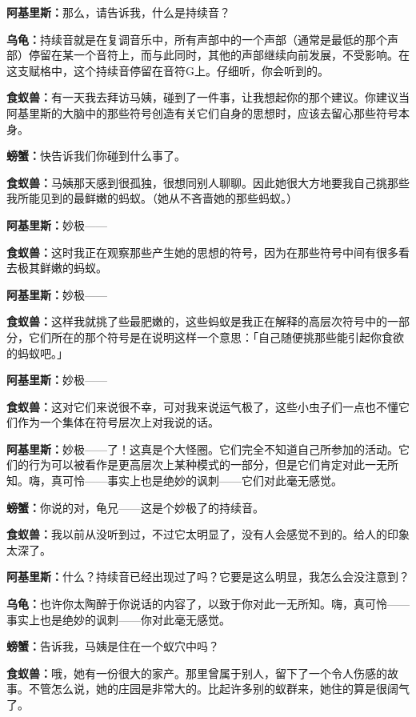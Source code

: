 \documentclass[
  12pt,
  twoside,
  openright,
  oldfontcommands,
]{memoir}
\newcommand{\kaitismall}[1]{{\kaitifamily\small #1}}
\newcommand{\dialogname}[1]{{\heifamily\bfseries #1}}
\begin{document}
\dialogname{阿基里斯：}那么，请告诉我，什么是持续音？

\dialogname{乌龟：}持续音就是在复调音乐中，所有声部中的一个声部（通常是最低的那个声部）停留在某一个音符上，而与此同时，其他的声部继续向前发展，不受影响。在这支赋格中，这个持续音停留在音符G上。仔细听，你会听到的。

\dialogname{食蚁兽：}有一天我去拜访马姨，碰到了一件事，让我想起你的那个建议。你建议当阿基里斯的大脑中的那些符号创造有关它们自身的思想时，应该去留心那些符号本身。

\dialogname{螃蟹：}快告诉我们你碰到什么事了。

\dialogname{食蚁兽：}马姨那天感到很孤独，很想同别人聊聊。因此她很大方地要我自己挑那些我所能见到的最鲜嫩的蚂蚁。\kaitismall{（她从不吝啬她的那些蚂蚁。）}

\dialogname{阿基里斯：}妙极------

\dialogname{食蚁兽：}这时我正在观察那些产生她的思想的符号，因为在那些符号中间有很多看去极其鲜嫩的蚂蚁。

\dialogname{阿基里斯：}妙极------

\dialogname{食蚁兽：}这样我就挑了些最肥嫩的，这些蚂蚁是我正在解释的高层次符号中的一部分，它们所在的那个符号是在说明这样一个意思：「自己随便挑那些能引起你食欲的蚂蚁吧。」

\dialogname{阿基里斯：}妙极------

\dialogname{食蚁兽：}这对它们来说很不幸，可对我来说运气极了，这些小虫子们一点也不懂它们作为一个集体在符号层次上对我说的话。

\dialogname{阿基里斯：}妙极------了！这真是个大怪圈。它们完全不知道自己所参加的活动。它们的行为可以被看作是更高层次上某种模式的一部分，但是它们肯定对此一无所知。嗨，真可怜------事实上也是绝妙的讽刺------它们对此毫无感觉。

\dialogname{螃蟹：}你说的对，龟兄------这是个妙极了的持续音。

\dialogname{食蚁兽：}我以前从没听到过，不过它太明显了，没有人会感觉不到的。给人的印象太深了。

\dialogname{阿基里斯：}什么？持续音已经出现过了吗？它要是这么明显，我怎么会没注意到？

\dialogname{乌龟：}也许你太陶醉于你说话的内容了，以致于你对此一无所知。嗨，真可怜------事实上也是绝妙的讽刺------你对此毫无感觉。

\dialogname{螃蟹：}告诉我，马姨是住在一个蚁穴中吗？

\dialogname{食蚁兽：}哦，她有一份很大的家产。那里曾属于别人，留下了一个令人伤感的故事。不管怎么说，她的庄园是非常大的。比起许多别的蚁群来，她住的算是很阔气了。
\end{document}

